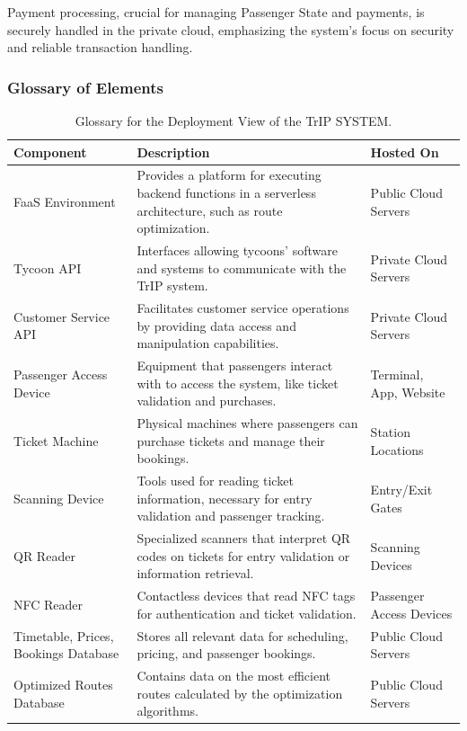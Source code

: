 Payment processing, crucial for managing Passenger State and payments, is securely handled in the private cloud, emphasizing the system's focus on security and reliable transaction handling. 
\subsubsection{Glossary of Elements}

\begin{table}[H]
    \centering
    \caption{Glossary for the Deployment View of the TrIP SYSTEM.}
    \label{tab:deployment_view_glossary}
    \begin{tabularx}{\textwidth}{@{}lXX@{}} %
    \toprule
    \textbf{Component} & \textbf{Description} & \textbf{Hosted On} \\
    \midrule
    FaaS Environment & Provides a platform for executing backend functions in a serverless architecture, such as route optimization. & Public Cloud Servers \\
    Tycoon API & Interfaces allowing tycoons' software and systems to communicate with the TrIP system. & Private Cloud Servers \\
    Customer Service API & Facilitates customer service operations by providing data access and manipulation capabilities. & Private Cloud Servers \\
    Passenger Access Device & Equipment that passengers interact with to access the system, like ticket validation and purchases. & Terminal, App, Website \\
    Ticket Machine & Physical machines where passengers can purchase tickets and manage their bookings. & Station Locations \\
    Scanning Device & Tools used for reading ticket information, necessary for entry validation and passenger tracking. & Entry/Exit Gates \\
    QR Reader & Specialized scanners that interpret QR codes on tickets for entry validation or information retrieval. & Scanning Devices \\
    NFC Reader & Contactless devices that read NFC tags for authentication and ticket validation. & Passenger Access Devices \\
    Timetable, Prices, Bookings Database & Stores all relevant data for scheduling, pricing, and passenger bookings. & Public Cloud Servers \\
    Optimized Routes Database & Contains data on the most efficient routes calculated by the optimization algorithms. & Public Cloud Servers \\

\end{tabularx}
\end{table}
